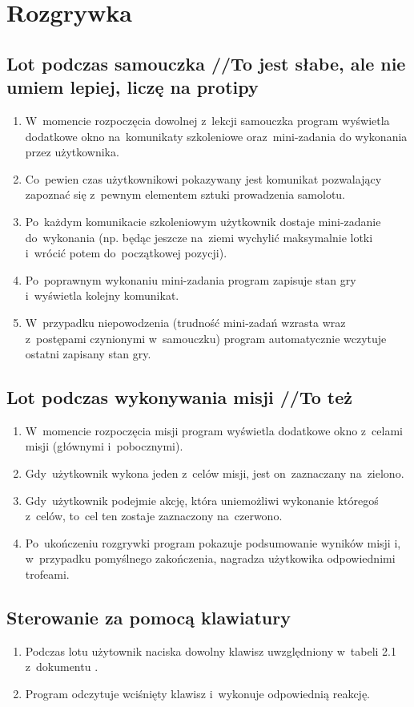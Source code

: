 \documentclass{mwrep}
\begin{document}
\chapter{Rozgrywka}
\section{Lot podczas samouczka //To jest słabe, ale nie umiem lepiej, liczę na protipy}
\begin{enumerate}
  \item W~momencie rozpoczęcia dowolnej z~lekcji samouczka program wyświetla dodatkowe okno na~komunikaty szkoleniowe oraz~mini-zadania do wykonania przez użytkownika.
  \item Co~pewien czas użytkownikowi pokazywany jest komunikat pozwalający zapoznać się z~pewnym elementem sztuki prowadzenia samolotu.
  \item Po~każdym komunikacie szkoleniowym użytkownik dostaje mini-zadanie do~wykonania (np. będąc jeszcze na~ziemi wychylić maksymalnie lotki i~wrócić potem do~początkowej pozycji).
  \item Po~poprawnym wykonaniu mini-zadania program zapisuje stan gry i~wyświetla kolejny komunikat.
  \item W~przypadku niepowodzenia (trudność mini-zadań wzrasta wraz z~postępami czynionymi w~samouczku) program automatycznie wczytuje ostatni zapisany stan gry.
\end{enumerate}

\section{Lot podczas wykonywania misji //To też}
\begin{enumerate}
  \item W~momencie rozpoczęcia misji program wyświetla dodatkowe okno z~celami misji (głównymi i~pobocznymi).
  \item Gdy~użytkownik wykona jeden z~celów misji, jest on~zaznaczany na~zielono.
  \item Gdy~użytkownik podejmie akcję, która uniemożliwi wykonanie któregoś z~celów, to~cel ten zostaje zaznaczony na~czerwono.
  \item Po~ukończeniu rozgrywki program pokazuje podsumowanie wyników misji i, w~przypadku pomyślnego zakończenia, nagradza użytkowika odpowiednimi trofeami.
\end{enumerate}

\section{Sterowanie za pomocą klawiatury}
\begin{enumerate}
  \item Podczas lotu użytownik naciska dowolny klawisz uwzględniony w~tabeli 2.1 z~dokumentu \cite{WYM}.
  \item Program odczytuje wciśnięty klawisz i~wykonuje odpowiednią reakcję.
\end{enumerate}
\end{document}
